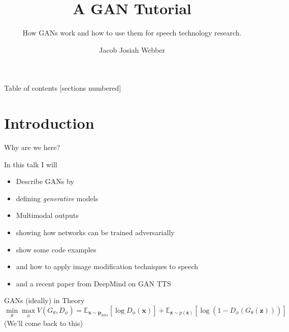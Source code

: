 \documentclass[10pt]{beamer}
\title{A GAN Tutorial}
\subtitle{How GANs work and how to use them for speech technology research.}
\date{}
\author{Jacob Josiah Webber}
\institute{Centre for Speech Technology Research}
\begin{document}
\maketitle

\begin{frame}{Table of contents}
  [sections numbered]
  \tableofcontents[hideallsubsections]
\end{frame}

\section{Introduction}

\begin{frame}[fragile]{Why are we here?}

In this talk I will
\begin{itemize}
    \item Describe GANs by
    \item defining \emph{generative} models
    \item Multimodal outputs
    \item showing how networks can be trained adversarially
    \item show some code examples
    \item and how to apply image modification techniques to speech
    \item and a recent paper from DeepMind on GAN TTS
\end{itemize}
\end{frame}

\begin{frame}{GANs (ideally) in Theory}
\begin{equation}
    \min_{\theta} \max_{\phi} V(G_\theta, D_\phi) = \mathbb{E}_{\mathbf{x} \sim \textbf{p}_{\textrm{data}}}[\log D_\phi(\textbf{x})] + 
\mathbb{E}_{\mathbf{z} \sim p(\textbf{z})}[\log (1-D_\phi(G_\theta(\textbf{z})))]
\end{equation}
(We'll come back to this)
\end{frame}
\end{document}
